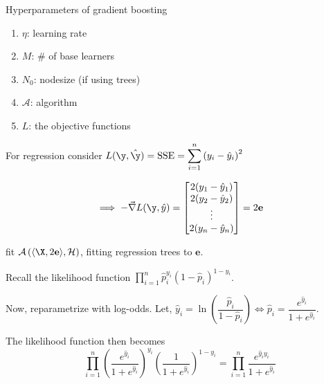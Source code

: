 \documentclass[12pt]{article}
\begin{document}
\begin{enumerate}
\begin{tcolorbox}[colback=white, sharp corners]
Hyperparameters of gradient boosting
\begin{enumerate}
\item $\eta$: learning rate
\item $M$: \# of base learners
\item $N_0$: nodesize (if using trees)
\item $\mathcal{A}$: algorithm 
\item $L$: the objective functions
\end{enumerate}
\end{tcolorbox}


\begin{tcolorbox}[colback=white, sharp corners]
For regression consider $L(\y, \hat{\y}) = \text{SSE} = \displaystyle \sum_{i=1}^n \left( y_i - \hat{y}_i \right)^2$

\[
	\implies - \vec{\nabla} L(\y, \hat{y}) = \begin{bmatrix}
	2(y_1 - \hat{y}_1) \\
	2(y_2 - \hat{y}_2) \\
	\vdots \\
	2(y_n - \hat{y}_n)
	\end{bmatrix} = 2 \mathbf{e}
\]

fit $\mathcal{A}\left(\langle \X, 2 \mathbf{e} \rangle , \mathcal{H}\right)$, fitting regression trees to $\mathbf{e}$.
\end{tcolorbox}


\begin{tcolorbox}[colback=white, sharp corners]
Recall the likelihood function $\displaystyle \prod_{i=1}^n \hat{p}_i^{y_i}(1 -\hat{p}_i)^{1 - y_i}$.

Now, reparametrize with log-odds. Let, $\hat{y}_i = \ln\left( \dfrac{\hat{p}_i}{1 - \hat{p}_i} \right) \Longleftrightarrow \hat{p}_i = \dfrac{e^{\hat{y}_i}}{1 + e^{\hat{y}_i}}$.

The likelihood function then becomes 
\[
	\prod_{i=1}^n \left( \dfrac{e^{\hat{y}_i}}{1 + e^{\hat{y}_i}} \right)^{y_i} \left( \dfrac{1}{1 + e^{\hat{y}_i}} \right)^{1- y_i} = \prod_{i=1}^n \dfrac{e^{\hat{y}_i y_i}}{1 + e^{\hat{y}_i}}
\]


\end{tcolorbox}
\end{enumerate}
\end{document}
